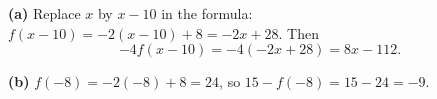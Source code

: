 \textbf{(a)} Replace $x$ by $x-10$ in the formula: $f(x-10)=-2(x-10)+8=-2x+28$. Then
\[
-4f(x-10)=-4(-2x+28)=\boxed{8x-112}.
\]

\textbf{(b)} $f(-8)=-2(-8)+8=24$, so $15-f(-8)=15-24=\boxed{-9}$.
